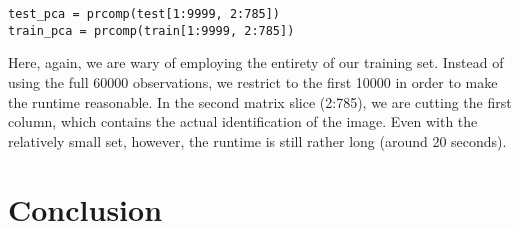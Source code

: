 \documentclass[10pt]{extarticle}
\begin{document}
\begin{verbatim}
test_pca = prcomp(test[1:9999, 2:785])
train_pca = prcomp(train[1:9999, 2:785])
\end{verbatim}

Here, again, we are wary of employing the entirety of our training set. Instead of using the full 60000 observations, we restrict to the first 10000 in order to make the runtime reasonable. In the second matrix slice (2:785), we are cutting the first column, which contains the actual identification of the image. Even with the relatively small set, however, the runtime is still rather long (around 20 seconds). 

\section{Conclusion}
\blank 
\end{document}
